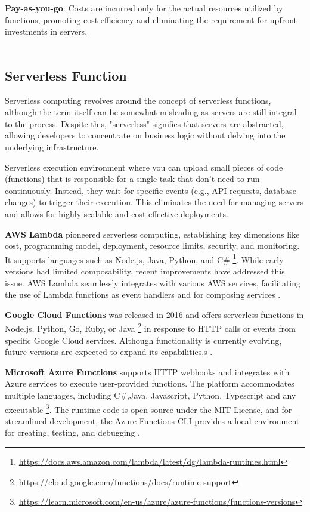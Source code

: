 \textbf{Pay-as-you-go}: Costs are incurred only for the actual resources utilized by functions, promoting cost efficiency and eliminating the requirement for upfront investments in servers.\\\\

\subsection {Serverless Function}

Serverless computing revolves around the concept of serverless functions, although the term itself can be somewhat misleading as servers are still integral to the process. Despite this, "serverless" signifies that servers are abstracted, allowing developers to concentrate on business logic without delving into the underlying infrastructure\cite{WW21}.

Serverless execution environment where you can upload small pieces of code (functions) that is responsible for a single task that don't need to run continuously. Instead, they wait for specific events (e.g., API requests, database changes) to trigger their execution. This eliminates the need for managing servers and allows for highly scalable and cost-effective deployments.

 \textbf {\ac{AWS}}  \textbf{Lambda}  pioneered serverless computing, establishing key dimensions like cost, programming model, deployment, resource limits, security, and monitoring. It supports languages such as Node.js, Java, Python, and C\# \footnote{\url{https://docs.aws.amazon.com/lambda/latest/dg/lambda-runtimes.html}}. While early versions had limited composability, recent improvements have addressed this issue. AWS Lambda seamlessly integrates with various AWS services, facilitating the use of Lambda functions as event handlers and for composing services \cite{Baldini17}.

 \textbf{Google Cloud Functions}  was released in 2016 and offers serverless functions in Node.js, Python, Go, Ruby, or Java \footnote{\url{https://cloud.google.com/functions/docs/runtime-support}} in response to HTTP calls or events from specific Google Cloud services. Although functionality is currently evolving, future versions are expected to expand its capabilities.s \cite{Baldini17}.

 \textbf{Microsoft Azure Functions} supports HTTP webhooks and integrates with Azure services to execute user-provided functions. The platform accommodates multiple languages, including C\#,Java, Javascript, Python, Typescript and any executable \footnote{\url{https://learn.microsoft.com/en-us/azure/azure-functions/functions-versions}}. The runtime code is open-source under the MIT License, and for streamlined development, the Azure Functions CLI provides a local environment for creating, testing, and debugging \cite{Baldini17}.

